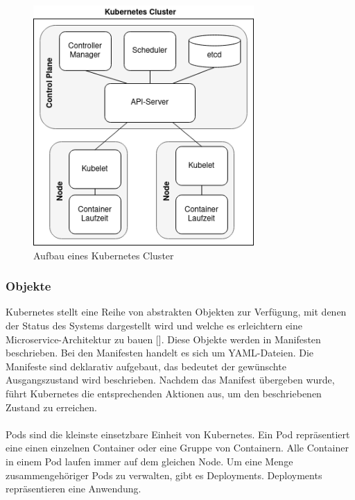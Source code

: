 \begin{figure}[H] 
    \centering
    \includegraphics[width=0.75\textwidth]{figures/KubernetesCluster.png}
    \caption{Aufbau eines Kubernetes Cluster}
\end{figure}

\subsubsection{Objekte}

Kubernetes stellt eine Reihe von abstrakten Objekten zur Verfügung, mit denen der Status des Systems dargestellt wird und welche es erleichtern eine Microservice-Architektur zu bauen [\cite[S. 13]{hightowerKubernetes2018}]. Diese Objekte werden in Manifesten beschrieben. Bei den Manifesten handelt es sich um YAML-Dateien. Die Manifeste sind deklarativ aufgebaut, das bedeutet der gewünschte Ausgangszustand wird beschrieben. Nachdem das Manifest übergeben wurde, führt Kubernetes die entsprechenden Aktionen aus, um den beschriebenen Zustand zu erreichen. \\
\\
Pods sind die kleinste einsetzbare Einheit von Kubernetes. Ein Pod repräsentiert eine einen einzelnen Container oder eine Gruppe von Containern. Alle Container in einem Pod laufen immer auf dem gleichen Node. Um eine Menge zusammengehöriger Pods zu verwalten, gibt es Deployments. Deployments repräsentieren eine Anwendung. 

